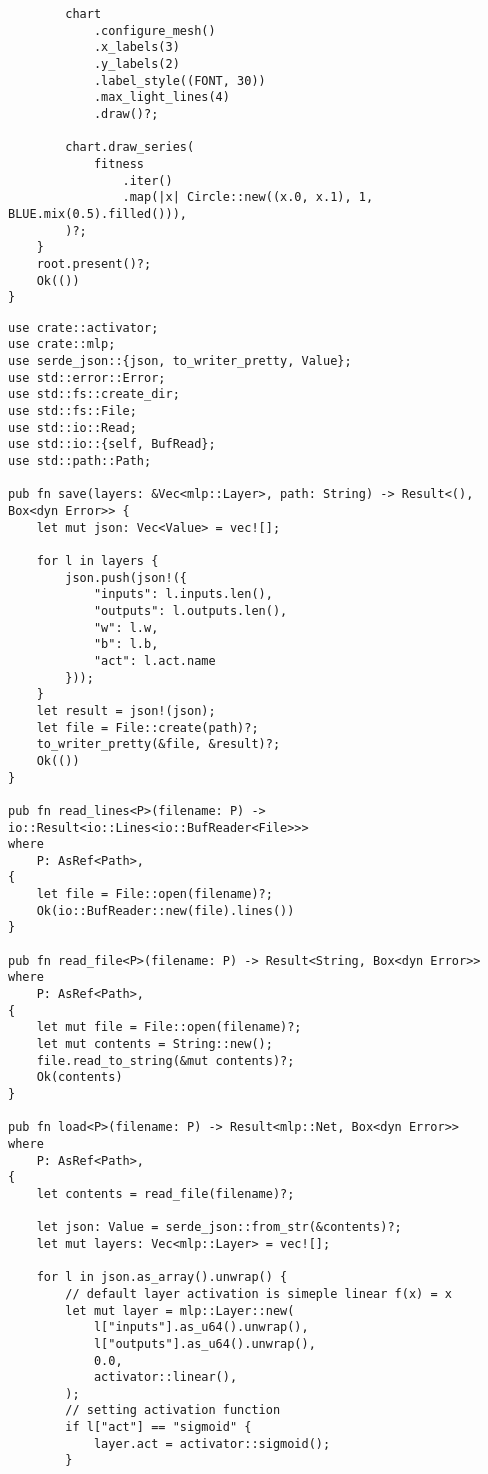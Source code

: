 \begin{code}
\begin{verbatim}
        chart
            .configure_mesh()
            .x_labels(3)
            .y_labels(2)   
            .label_style((FONT, 30))
            .max_light_lines(4)
            .draw()?;

        chart.draw_series(
            fitness
                .iter()
                .map(|x| Circle::new((x.0, x.1), 1, BLUE.mix(0.5).filled())),
        )?;
    }
    root.present()?;
    Ok(())
}

\end{verbatim}
\end{code}

\begin{code}
\caption{utills/io.rs}
\begin{verbatim}   
use crate::activator;
use crate::mlp;
use serde_json::{json, to_writer_pretty, Value};
use std::error::Error;
use std::fs::create_dir;
use std::fs::File;
use std::io::Read;
use std::io::{self, BufRead};
use std::path::Path;

pub fn save(layers: &Vec<mlp::Layer>, path: String) -> Result<(), Box<dyn Error>> {
    let mut json: Vec<Value> = vec![];

    for l in layers {
        json.push(json!({
            "inputs": l.inputs.len(),
            "outputs": l.outputs.len(),
            "w": l.w,
            "b": l.b,
            "act": l.act.name
        }));
    }
    let result = json!(json);
    let file = File::create(path)?;
    to_writer_pretty(&file, &result)?;
    Ok(())
}

pub fn read_lines<P>(filename: P) -> io::Result<io::Lines<io::BufReader<File>>>
where
    P: AsRef<Path>,
{
    let file = File::open(filename)?;
    Ok(io::BufReader::new(file).lines())
}

pub fn read_file<P>(filename: P) -> Result<String, Box<dyn Error>>
where
    P: AsRef<Path>,
{
    let mut file = File::open(filename)?;
    let mut contents = String::new();
    file.read_to_string(&mut contents)?;
    Ok(contents)
}

pub fn load<P>(filename: P) -> Result<mlp::Net, Box<dyn Error>>
where
    P: AsRef<Path>,
{
    let contents = read_file(filename)?;

    let json: Value = serde_json::from_str(&contents)?;
    let mut layers: Vec<mlp::Layer> = vec![];

    for l in json.as_array().unwrap() {
        // default layer activation is simeple linear f(x) = x
        let mut layer = mlp::Layer::new(
            l["inputs"].as_u64().unwrap(),
            l["outputs"].as_u64().unwrap(),
            0.0,
            activator::linear(),
        );
        // setting activation function
        if l["act"] == "sigmoid" {
            layer.act = activator::sigmoid();
        }


\end{verbatim}
\end{code}
